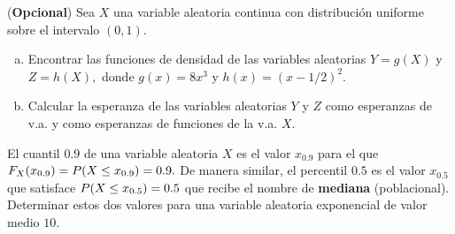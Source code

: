 \documentclass[12pt]{article}
\begin{document}
\probl  (\textbf{Opcional}) Sea $X$ una variable aleatoria continua con distribución uniforme sobre el
intervalo  $(0,1).$
\begin{enumerate}[a)]
\item Encontrar las funciones de densidad de las variables aleatorias
 $Y
= g(X)$ y $Z = h(X),$ donde $g(x) = 8 x^3$ y $h(x) = (x-1/2)^2.$
\item  Calcular la esperanza de las variables aleatorias $Y$ y
$Z$ como esperanzas de v.a. y como esperanzas de funciones de la v.a. $X$. 
 \end{enumerate}





\probl  El cuantil $0.9$ de una variable aleatoria $X$ es el valor $x_{0.9}$ para el que $
\displaystyle F_{X}(x_{0.9}) = P(X \leq x_{0.9}) = 0.9. $ De manera similar, el percentil
$0.5$ es el valor $x_{0.5}$ que satisface $ P(X \leq x_{0.5}) = 0.5 $ que recibe el nombre
de  {\bf mediana} (poblacional). Determinar estos dos valores para  una variable aleatoria
exponencial de valor medio $10$. 
\end{document}
